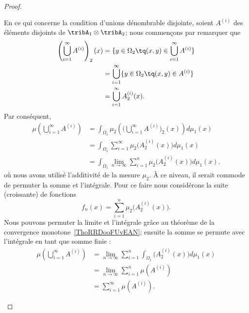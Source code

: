 \begin{proof}
\begin{subproof}
		En ce qui concerne la condition d'unions dénombrable disjointe, soient \( A^{(i)}\) des éléments disjoints de \( \tribA_1\otimes \tribA_2\); nous commençons par remarquer que
		\begin{subequations}
			\begin{align}
				\left( \bigcup_{i=1}^{\infty}A^{(i)} \right)_2(x) & =\{ y\in\Omega_2\tq (x,y)\in\bigcup_{i=1}^{\infty}A^{(i)} \}  \\
				                                                  & =\bigcup_{i=1}^{\infty}\{ y\in\Omega_2\tq (x,y)\in A^{(i)} \} \\
				                                                  & =\bigcup_{i=1}^{\infty}A^{(i)}_2(x).
			\end{align}
		\end{subequations}
		Par conséquent,
		\begin{subequations}
			\begin{align}
				\mu\left( \bigcup_{i=1}^{\infty}A^{(i)} \right) & =\int_{\Omega_1}\mu_2\left(    \Big( \bigcup_{i=1}^{\infty}A^{(i)} \Big)_2(x)     \right)d\mu_1(x) \\
				                                                & =\int_{\Omega_1}\sum_{i=1}^{\infty}\mu_2\big( A^{(i)}_2(x) \big)d\mu_1(x)                          \\
				                                                & =\int_{\Omega_1}\lim_{n\to \infty} \sum_{i=1}^{n}\mu_2\big( A^{(i)}_2(x) \big)d\mu_1(x).
			\end{align}
		\end{subequations}
		où nous avons utilisé l'additivité de la mesure \( \mu_2\). À ce niveau, il serait commode de permuter la somme et l'intégrale. Pour ce faire nous considérons la suite (croissante) de fonctions
		\begin{equation}
			f_n(x)=\sum_{i=1}^n\mu_2\big( A_2^{(i)}(x) \big).
		\end{equation}
		Nous pouvons permuter la limite et l'intégrale grâce au théorème de la convergence monotone~\ref{ThoRRDooFUvEAN}; ensuite la somme se permute avec l'intégrale en tant que somme finie :
		\begin{subequations}
			\begin{align}
				\mu\left( \bigcup_{i=1}^{\infty}A^{(i)} \right) & =\lim_{n\to \infty} \sum_{i=1}^n\int_{\Omega_1}\big( A_2^{(i)}(x) \big)d\mu_1(x) \\
				                                                & =\lim_{n\to \infty} \sum_{i=1}^n\mu(A^{(i)})                                     \\
				                                                & =\sum_{i=1}^{\infty}\mu( A^{(i)} ).
			\end{align}
		\end{subequations}


\end{subproof}
\end{proof}
